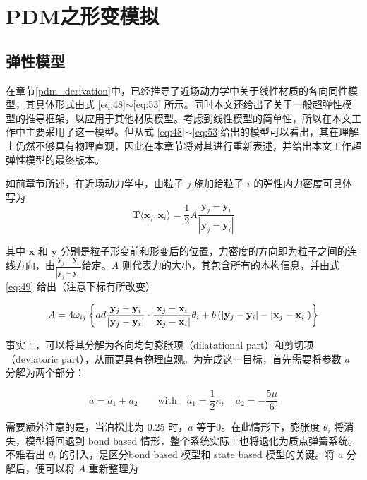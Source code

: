 ﻿\chapter{PDM之形变模拟}

\section{弹性模型}
\label{elasitcity_model}

在章节\ref{pdm_derivation}中，已经推导了近场动力学中关于线性材质的各向同性模型，其具体形式由式 \ref{eq:48}$\sim$\ref{eq:53} 所示。同时本文还给出了关于一般超弹性模型的推导框架，以应用于其他材质模型。考虑到线性模型的简单性，所以在本文工作中主要采用了这一模型。但从式 \ref{eq:48}$\sim$\ref{eq:53}给出的模型可以看出，其在理解上仍然不够具有物理直观，因此在本章节将对其进行重新表述，并给出本文工作超弹性模型的最终版本。

如前章节所述，在近场动力学中，由粒子 $j$ 施加给粒子 $i$ 的弹性内力密度可具体写为
\begin{equation}
\mathbf{T}\langle\mathbf{x}_j,\mathbf{x}_i\rangle = \frac{1}{2}A\frac{\mathbf{y}_j-\mathbf{y}_i}{|\mathbf{y}_j-\mathbf{y}_i|}
\end{equation}

其中 $\mathbf{x}$ 和 $\mathbf{y}$ 分别是粒子形变前和形变后的位置，力密度的方向即为粒子之间的连线方向，由$\frac{\mathbf{y}_j-\mathbf{y}_i}{|\mathbf{y}_j-\mathbf{y}_i|}$给定。$A$ 则代表力的大小，其包含所有的本构信息，并由式 \ref{eq:49} 给出（注意下标有所改变）

\begin{equation}
A = 4\omega_{ij}\left\{ad\frac{\mathbf{y}_j-\mathbf{y}_i}{|\mathbf{y}_j-\mathbf{y}_i|}\cdot\frac{\mathbf{x}_j-\mathbf{x}_i}{|\mathbf{x}_j-\mathbf{x}_i|}\theta_i
   +b\left(|\mathbf{y}_j - \mathbf{y}_i| - |\mathbf{x}_j - \mathbf{x}_i|\right) \right\}
\end{equation}

事实上，可以将其分解为各向均匀膨胀项（dilatational part）和剪切项（deviatoric part），从而更具有物理直观。为完成这一目标，首先需要将参数 $a$ 分解为两个部分：

\begin{equation}
a = a_1 + a_2 \qquad \mathrm{with}\quad a_1 = \frac{1}{2}\kappa ,\quad a_2 = -\frac{5\mu}{6}
\end{equation}

需要额外注意的是，当泊松比为 0.25 时，$a$ 等于0。在此情形下，膨胀度 $\theta_i$ 将消失，模型将回退到 bond based 情形，整个系统实际上也将退化为质点弹簧系统。不难看出 $\theta_i$ 的引入，是区分bond based 模型和 state based 模型的关键。将 $a$ 分解后，便可以将 $A$ 重新整理为

